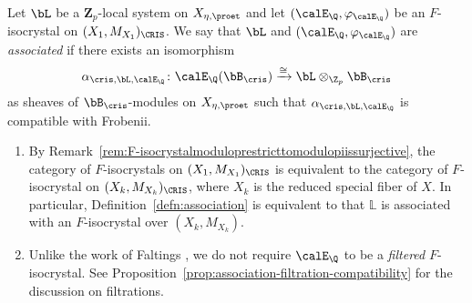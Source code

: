 \begin{defn} \label{defn:association}
Let $\bL$ be a $\mathbf{Z}_p$-local system on $X_{\eta,\proet}$ and let $(\calE_\Q,\varphi_{\calE_\Q})$ be an $F$-isocrystal on $(X_1,M_{X_1})_{\CRIS}$. We say that $\bL$ and $(\calE_\Q,\varphi_{\calE_\Q})$ are \emph{associated} if there exists an isomorphism 
\[
\alpha_{\cris,\bL,\calE_\Q}\colon \calE_\Q(\bB_{\cris})\xrightarrow{\cong}\bL\otimes_{\Z_p}\bB_\cris
\]
as sheaves of $\bB_\cris$-modules on $X_{\eta, \proet}$ such that $\alpha_{\cris,\bL,\calE_\Q}$ is compatible with Frobenii.
\end{defn}


\begin{rem}\label{rem:association over general base} \hfill
\begin{enumerate}
\item By Remark~\ref{rem:F-isocrystalmoduloprestricttomodulopiissurjective}, the category of $F$-isocrystals on $(X_1,M_{X_1})_{\CRIS}$ is equivalent to the category of $F$-isocrystal on $(X_k,M_{X_k})_{\CRIS}$, where $X_k$ is the reduced special fiber of $X$.  
In particular, Definition~\ref{defn:association} is equivalent to that $\mathbb{L}$ is associated with an $F$-isocrystal over $(X_k,M_{X_k})$.
\item Unlike the work of Faltings \cite{Faltings-CryscohandGalrep}, we do not require $\calE_\Q$ to be a \emph{filtered} $F$-isocrystal. See Proposition~\ref{prop:association-filtration-compatibility} for the discussion on filtrations.
\end{enumerate}
\end{rem}


